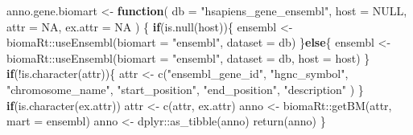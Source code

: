 \documentclass[
]{article}
\newenvironment{Shaded}{\begin{snugshade}}{\end{snugshade}}
\newcommand{\AttributeTok}[1]{\textcolor[rgb]{0.77,0.63,0.00}{#1}}
\newcommand{\ConstantTok}[1]{\textcolor[rgb]{0.00,0.00,0.00}{#1}}
\newcommand{\ControlFlowTok}[1]{\textcolor[rgb]{0.13,0.29,0.53}{\textbf{#1}}}
\newcommand{\FunctionTok}[1]{\textcolor[rgb]{0.00,0.00,0.00}{#1}}
\newcommand{\NormalTok}[1]{#1}
\newcommand{\OtherTok}[1]{\textcolor[rgb]{0.56,0.35,0.01}{#1}}
\newcommand{\SpecialCharTok}[1]{\textcolor[rgb]{0.00,0.00,0.00}{#1}}
\newcommand{\StringTok}[1]{\textcolor[rgb]{0.31,0.60,0.02}{#1}}
\begin{document}
\begin{Shaded}
\begin{Highlighting}[]
\NormalTok{anno.gene.biomart }\OtherTok{\textless{}{-}} 
  \ControlFlowTok{function}\NormalTok{(}
    \AttributeTok{db =} \StringTok{"hsapiens\_gene\_ensembl"}\NormalTok{,}
    \AttributeTok{host =} \ConstantTok{NULL}\NormalTok{,}
    \AttributeTok{attr =} \ConstantTok{NA}\NormalTok{,}
    \AttributeTok{ex.attr =} \ConstantTok{NA}
\NormalTok{    )}
\NormalTok{  \{}
    \ControlFlowTok{if}\NormalTok{(}\FunctionTok{is.null}\NormalTok{(host))\{}
\NormalTok{      ensembl }\OtherTok{\textless{}{-}}\NormalTok{ biomaRt}\SpecialCharTok{::}\FunctionTok{useEnsembl}\NormalTok{(}\AttributeTok{biomart =} \StringTok{"ensembl"}\NormalTok{, }\AttributeTok{dataset =}\NormalTok{ db)}
\NormalTok{    \}}\ControlFlowTok{else}\NormalTok{\{}
\NormalTok{      ensembl }\OtherTok{\textless{}{-}}\NormalTok{ biomaRt}\SpecialCharTok{::}\FunctionTok{useEnsembl}\NormalTok{(}\AttributeTok{biomart =} \StringTok{"ensembl"}\NormalTok{, }\AttributeTok{dataset =}\NormalTok{ db, }\AttributeTok{host =}\NormalTok{ host)}
\NormalTok{    \}}
    \ControlFlowTok{if}\NormalTok{(}\SpecialCharTok{!}\FunctionTok{is.character}\NormalTok{(attr))\{}
\NormalTok{      attr }\OtherTok{\textless{}{-}} \FunctionTok{c}\NormalTok{(}\StringTok{"ensembl\_gene\_id"}\NormalTok{,}
        \StringTok{"hgnc\_symbol"}\NormalTok{,}
        \StringTok{"chromosome\_name"}\NormalTok{,}
        \StringTok{"start\_position"}\NormalTok{,}
        \StringTok{"end\_position"}\NormalTok{,}
        \StringTok{"description"}
\NormalTok{      )}
\NormalTok{    \}}
    \ControlFlowTok{if}\NormalTok{(}\FunctionTok{is.character}\NormalTok{(ex.attr))}
\NormalTok{      attr }\OtherTok{\textless{}{-}} \FunctionTok{c}\NormalTok{(attr, ex.attr)}
\NormalTok{    anno }\OtherTok{\textless{}{-}}\NormalTok{ biomaRt}\SpecialCharTok{::}\FunctionTok{getBM}\NormalTok{(attr, }\AttributeTok{mart =}\NormalTok{ ensembl)}
\NormalTok{    anno }\OtherTok{\textless{}{-}}\NormalTok{ dplyr}\SpecialCharTok{::}\FunctionTok{as\_tibble}\NormalTok{(anno)}
    \FunctionTok{return}\NormalTok{(anno)}
\NormalTok{  \}}
 

\end{Highlighting}
\end{Shaded}
\end{document}

